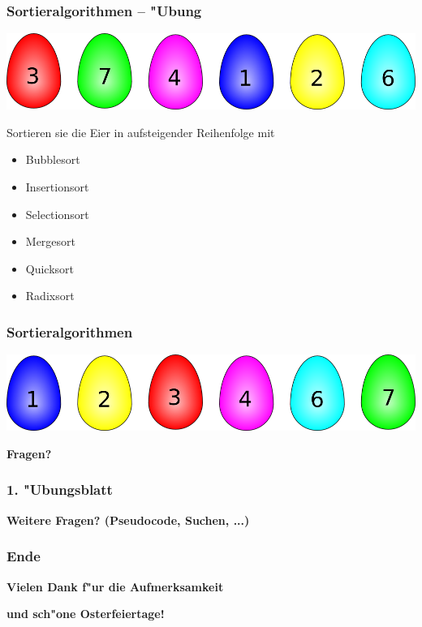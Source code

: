 \documentclass{beamer}
\begin{document}
\begin{frame}
\frametitle{Sortieralgorithmen -- "Ubung}
\includegraphics[scale=0.55]{eggs_unsorted}

\pause

\begin{exampleblock}{Sortieren sie die Eier in aufsteigender Reihenfolge mit}
\begin{itemize}
\item Bubblesort\pause
\item Insertionsort\pause
\item Selectionsort\pause
\item Mergesort\pause
\item Quicksort\pause
\item Radixsort
\end{itemize}
\end{exampleblock}
\end{frame}


\begin{frame}
\frametitle{Sortieralgorithmen}
\includegraphics[scale=0.55]{eggs_sorted}
\vspace{1cm}

\begin{center}
\textbf{\Huge Fragen?}
\end{center}
\end{frame}


\begin{frame}
\frametitle{1. "Ubungsblatt}

\pause

\begin{center}
\textbf{\Huge Weitere Fragen? (Pseudocode, Suchen, ...)}
\end{center}
\end{frame}


\begin{frame}
\frametitle{Ende}
\begin{center}
\textbf{\Huge Vielen Dank f"ur die Aufmerksamkeit}
\end{center}


\begin{center}
\textbf{\Huge und sch"one Osterfeiertage!}
\end{center}
\end{frame}
\end{document}
